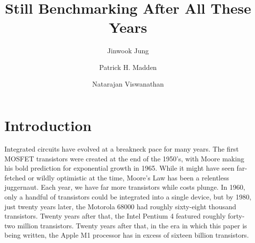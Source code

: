 \documentclass[sigconf]{acmart}
\begin{document}
\title{Still Benchmarking After All These Years}
\iffalse
\author{Blind Review}
\else
\author{Jinwook Jung}
\author{Patrick H. Madden}
\author{Natarajan Viswanathan}


 
\fi
\begin{abstract}

\end{abstract}

\begin{CCSXML}
\end{CCSXML}



%


\maketitle

\section{Introduction}

Integrated circuits have evolved at a breakneck pace for many years.  The
first MOSFET transistors were created at the end of the 1950's, with 
Moore\cite{Moore650114} making his bold prediction for exponential growth
in 1965.  While it might have seen far-fetched or wildly optimistic
at the time, Moore's Law has been a relentless juggernaut.
Each year, we have far more
transistors while costs plunge.
In 1960, only a handful of transistors could be integrated into a single
device, but by 1980, just twenty years later, the Motorola 68000 had
roughly sixty-eight thousand transistors.  Twenty years after that, the Intel Pentium 4
featured roughly forty-two million transistors.  Twenty years after that, in
the era in which this paper is being written, the Apple M1 processor has
in excess of sixteen billion transistors.

\end{document}

